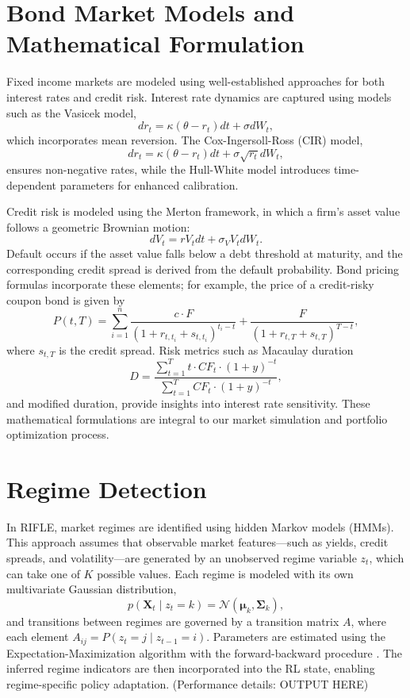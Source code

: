 \documentclass[
  a4paper,
  10pt,
  unnumberedsections,
  twoside,
]{LTJournalArticle}
\begin{document}
\section{Bond Market Models and Mathematical Formulation}
Fixed income markets are modeled using well-established approaches for both interest rates and credit risk. Interest rate dynamics are captured using models such as the Vasicek model,
\[
dr_t = \kappa(\theta - r_t)dt + \sigma dW_t,
\]
which incorporates mean reversion. The Cox-Ingersoll-Ross (CIR) model,
\[
dr_t = \kappa(\theta - r_t)dt + \sigma\sqrt{r_t}dW_t,
\]
ensures non-negative rates, while the Hull-White model introduces time-dependent parameters for enhanced calibration. 

Credit risk is modeled using the Merton framework, in which a firm’s asset value follows a geometric Brownian motion:
\[
dV_t = rV_tdt + \sigma_V V_t dW_t.
\]
Default occurs if the asset value falls below a debt threshold at maturity, and the corresponding credit spread is derived from the default probability. Bond pricing formulas incorporate these elements; for example, the price of a credit-risky coupon bond is given by
\[
P(t,T) = \sum_{i=1}^n \frac{c \cdot F}{(1+r_{t,t_i}+s_{t,t_i})^{t_i-t}} + \frac{F}{(1+r_{t,T}+s_{t,T})^{T-t}},
\]
where $s_{t,T}$ is the credit spread. Risk metrics such as Macaulay duration
\[
D = \frac{\sum_{t=1}^{T} t \cdot CF_t \cdot (1+y)^{-t}}{\sum_{t=1}^{T} CF_t \cdot (1+y)^{-t}},
\]
and modified duration, provide insights into interest rate sensitivity. These mathematical formulations are integral to our market simulation and portfolio optimization process.

\section{Regime Detection}
In RIFLE, market regimes are identified using hidden Markov models (HMMs). This approach assumes that observable market features—such as yields, credit spreads, and volatility—are generated by an unobserved regime variable $z_t$, which can take one of $K$ possible values. Each regime is modeled with its own multivariate Gaussian distribution,
\[
p(\mathbf{X}_t \mid z_t=k) = \mathcal{N}(\boldsymbol{\mu}_k, \boldsymbol{\Sigma}_k),
\]
and transitions between regimes are governed by a transition matrix $A$, where each element $A_{ij} = P(z_t=j \mid z_{t-1}=i)$. Parameters are estimated using the Expectation-Maximization algorithm with the forward-backward procedure \cite{hamilton1989}. The inferred regime indicators are then incorporated into the RL state, enabling regime-specific policy adaptation. (Performance details: OUTPUT HERE)
\end{document}
